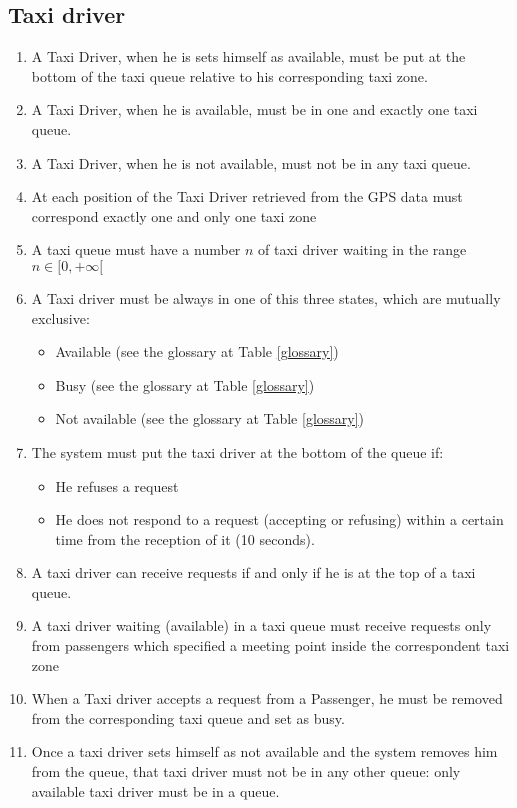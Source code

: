 \subsection{Taxi driver}
\begin{enumerate}
\item A Taxi Driver, when he is sets himself as available, must be put at the bottom of the taxi queue relative to his corresponding taxi zone.
\item A Taxi Driver, when he is available, must be in one and exactly one taxi queue.
\item A Taxi Driver, when he is not available, must not be in any taxi queue.
\item At each position of the Taxi Driver retrieved from the GPS data must correspond exactly one and only one taxi zone
\item A taxi queue must have a number $n$ of taxi driver waiting in the range $n\in[0,+\infty[$
\item A Taxi driver must be always in one of this three states, which are mutually exclusive:
\begin{itemize}
	\item Available (see the glossary at Table \ref{glossary})
	\item Busy (see the glossary at Table \ref{glossary})
	\item Not available	(see the glossary at Table \ref{glossary})
\end{itemize}
\item The system must put the taxi driver at the bottom of the queue if:
\begin{itemize}
	\item He refuses a request
	\item He does not respond to a request (accepting or refusing) within a certain time from the reception of it (10 seconds).
\end{itemize}
\item A taxi driver can receive requests if and only if he is at the top of a taxi queue.
\item A taxi driver waiting (available) in a taxi queue must receive requests only from passengers which specified a meeting point inside the correspondent taxi zone
\item When a Taxi driver accepts a request from a Passenger, he must be removed from the corresponding taxi queue and set as busy.
\item Once a taxi driver sets himself as not available and the system removes him from the queue, that taxi driver must not be in any other queue: only available taxi driver must be in a queue.
\end{enumerate}
